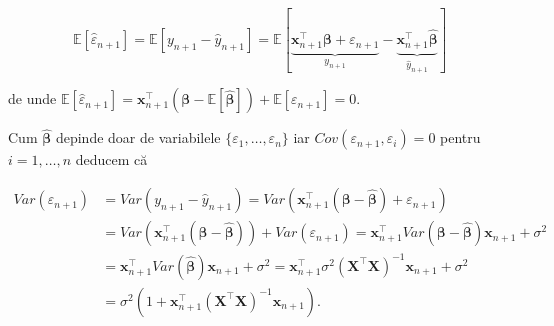 \documentclass[]{article}
\begin{document}
\[
  \mathbb{E}[\hat{\varepsilon}_{n+1}] = \mathbb{E}[ y_{n+1} - \hat{y}_{n+1}] = \mathbb{E}\left[\underbrace{\boldsymbol x_{n+1}^\intercal \boldsymbol \beta + \varepsilon_{n+1}}_{y_{n+1}} - \underbrace{\boldsymbol x_{n+1}^\intercal\hat{\boldsymbol \beta}}_{\hat{y}_{n+1}}\right]
\]

de unde
\(\mathbb{E}[\hat{\varepsilon}_{n+1}] = \boldsymbol x_{n+1}^\intercal\left(\boldsymbol \beta - \mathbb{E}[\hat{\boldsymbol \beta}]\right) + \mathbb{E}[\varepsilon_{n+1}] = 0\).

Cum \(\hat{\boldsymbol \beta}\) depinde doar de variabilele
\(\{\varepsilon_1,\ldots,\varepsilon_n\}\) iar
\(Cov(\varepsilon_{n+1}, \varepsilon_i)=0\) pentru \(i = 1,\ldots,n\)
deducem că

\begin{align*}
  Var(\hat{\varepsilon}_{n+1}) &= Var\left(y_{n+1} - \hat{y}_{n+1}\right) = Var\left(\boldsymbol x_{n+1}^\intercal\left(\boldsymbol \beta - \hat{\boldsymbol \beta}\right) + \varepsilon_{n+1}\right) \\
  &= Var\left(\boldsymbol x_{n+1}^\intercal\left(\boldsymbol \beta - \hat{\boldsymbol \beta}\right)\right) + Var(\varepsilon_{n+1}) = \boldsymbol x_{n+1}^\intercal Var(\boldsymbol \beta - \hat{\boldsymbol \beta}) \boldsymbol x_{n+1} + \sigma^2\\
  &= \boldsymbol x_{n+1}^\intercal Var(\hat{\boldsymbol \beta}) \boldsymbol x_{n+1} + \sigma^2 = \boldsymbol x_{n+1}^\intercal \sigma^2(\boldsymbol X^\intercal \boldsymbol X)^{-1}  \boldsymbol x_{n+1} + \sigma^2\\
  &= \sigma^2\left(1 + \boldsymbol x_{n+1}^\intercal(\boldsymbol X^\intercal \boldsymbol X)^{-1}\boldsymbol x_{n+1}\right).
\end{align*}
\end{document}
